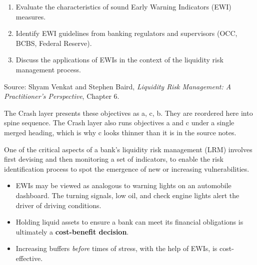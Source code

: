 
\begin{lrkeybox}
\begin{enumerate}[label=\textbf{\alph*.}]
\item Evaluate the characteristics of sound Early Warning Indicators (EWI) measures.
\item Identify EWI guidelines from banking regulators and supervisors (OCC, BCBS, Federal Reserve).
\item Discuss the applications of EWIs in the context of the liquidity risk management process.
\end{enumerate}
{\footnotesize\color{FRMGrey}Source: Shyam Venkat and Stephen Baird, \textit{Liquidity Risk Management: A Practitioner's Perspective}, Chapter 6.}
\end{lrkeybox}

\begin{lrtrapbox}
The Crash layer presents these objectives as a, c, b. They are reordered here into spine sequence. The Crash layer also runs objectives a and c under a single merged heading, which is why c looks thinner than it is in the source notes.
\end{lrtrapbox}


One of the critical aspects of a bank's liquidity risk management (LRM) involves first devising and then monitoring a set of indicators, to enable the risk identification process to spot the emergence of new or increasing vulnerabilities.

\begin{lrkeybox}
\begin{itemize}
\item EWIs may be viewed as analogous to warning lights on an automobile dashboard. The turning signals, low oil, and check engine lights alert the driver of driving conditions.
\item Holding liquid assets to ensure a bank can meet its financial obligations is ultimately a \textbf{cost-benefit decision}.
\item Increasing buffers \emph{before} times of stress, with the help of EWIs, is cost-effective.
\end{itemize}
\end{lrkeybox}

